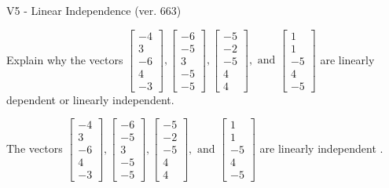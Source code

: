 \begin{exercise}
  \begin{exerciseTitle}V5 - Linear Independence (ver. 663)\end{exerciseTitle}
  \begin{exerciseStatement}
    Explain why the vectors \(\left[\begin{array}{r}
-4 \\
3 \\
-6 \\
4 \\
-3
\end{array}\right] , \left[\begin{array}{r}
-6 \\
-5 \\
3 \\
-5 \\
-5
\end{array}\right] , \left[\begin{array}{r}
-5 \\
-2 \\
-5 \\
4 \\
4
\end{array}\right] , \text{ and } \left[\begin{array}{r}
1 \\
1 \\
-5 \\
4 \\
-5
\end{array}\right]\) are linearly dependent or linearly independent.	


  \end{exerciseStatement}
  \begin{exerciseAnswer}
   The vectors \(\left[\begin{array}{r}
-4 \\
3 \\
-6 \\
4 \\
-3
\end{array}\right] , \left[\begin{array}{r}
-6 \\
-5 \\
3 \\
-5 \\
-5
\end{array}\right] , \left[\begin{array}{r}
-5 \\
-2 \\
-5 \\
4 \\
4
\end{array}\right] , \text{ and } \left[\begin{array}{r}
1 \\
1 \\
-5 \\
4 \\
-5
\end{array}\right]\) are 
  	 linearly independent  .
  


  \end{exerciseAnswer}
\end{exercise}